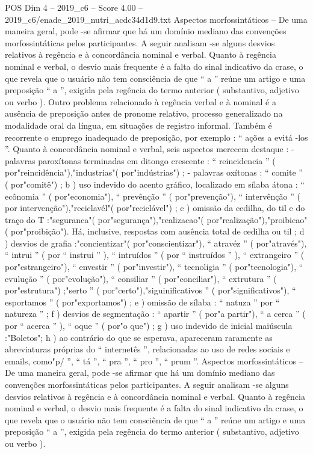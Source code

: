 \begin{textsample}{POS Dim 4 – 2019\_c6 – Score 4.00 – 2019\_c6/enade\_2019\_nutri\_acdc34d1d9.txt}
Aspectos morfossintáticos – De uma maneira geral, pode -se afirmar que há um domínio mediano das convenções morfossintáticas pelos participantes.
A seguir analisam -se alguns desvios relativos à regência e à concordância nominal e verbal.
Quanto à regência nominal e verbal, o desvio mais frequente é a falta do sinal indicativo da crase, o que revela que o usuário não tem consciência de que “ a ” reúne um artigo e uma preposição “ a ”, exigida pela regência do termo anterior ( substantivo, adjetivo ou verbo ).
Outro problema relacionado à regência verbal e à nominal é a ausência de preposição antes de pronome relativo, processo generalizado na modalidade oral da língua, em situações de registro informal.
Também é recorrente o emprego inadequado de preposição, por exemplo : “ ações a evitá -los ”.
Quanto à concordância nominal e verbal, seis aspectos merecem destaque : - palavras paroxítonas terminadas em ditongo crescente : “ reincidencia ” ( por"reincidência"),"industrias"( por"indústrias") ; - palavras oxítonas : “ comite ” ( por"comitê") ; b ) uso indevido do acento gráfico, localizado em sílaba átona : “ ecônomia ” ( por"economia"), “ prevênção ” ( por"prevenção"), “ intervênção ” ( por intervenção"),"reciclavél"( por"reciclável") ; c ) omissão da cedilha, do til e do traço do T :"seguranca"( por"segurança"),"realizacao"( por"realização"),"proibicao"( por"proibição").
Há, inclusive, respostas com ausência total de cedilha ou til ; d ) desvios de grafia :"concientizar"( por"conscientizar"), “ atravéz ” ( por"através"), “ intrui ” ( por “ instrui ” ), “ intruídos ” ( por “ instruídos ” ), “ extrangeiro ” ( por"estrangeiro"), “ envestir ” ( por"investir"), “ tecnoligia ” ( por"tecnologia"), “ evulução ” ( por"evolução"), “ consiliar ” ( por"conciliar"), “ extrutura ” ( por"estrutura") ;"serto ” ( por"certo"),"siguinificativos ” ( por"significativos"), “ esportamos ” ( por"exportamos") ; e ) omissão de sílaba : “ natuza ” por “ natureza ” ; f ) desvios de segmentação : “ apartir ” ( por"a partir"), “ a cerca ” ( por “ acerca ” ), “ oque ” ( por"o que") ; g ) uso indevido de inicial maiúscula :"Boletos"; h ) ao contrário do que se esperava, apareceram raramente as abreviaturas próprias do “ internetês ”, relacionadas ao uso de redes sociais e emails, como"p/ ”, “ tá ”, “ pra ”, “ pro ”, “ prum ”.
Aspectos morfossintáticos – De uma maneira geral, pode -se afirmar que há um domínio mediano das convenções morfossintáticas pelos participantes.
A seguir analisam -se alguns desvios relativos à regência e à concordância nominal e verbal.
Quanto à regência nominal e verbal, o desvio mais frequente é a falta do sinal indicativo da crase, o que revela que o usuário não tem consciência de que “ a ” reúne um artigo e uma preposição “ a ”, exigida pela regência do termo anterior ( substantivo, adjetivo ou verbo ).

\end{textsample}
